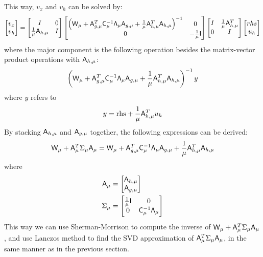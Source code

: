 This way, $v_x$ and $v_h$ can be solved by: 
\begin{equation}\label{eq:core_equ}
\begin{bmatrix} v_x \\ v_h  \end{bmatrix} 
=
\begin{bmatrix}
I & 0 \\
\frac{1}{\mu} \mathsf{A}_{h,\mu}  &  I 
\end{bmatrix}
\begin{bmatrix}
\left(\mathsf{W}_\mu +  \mathsf{A}_{g,\mu}^T  \mathsf{C}_\mu^{-1} \mathsf{\Lambda}_\mu  \mathsf{A}_{g,\mu}  
+ \frac{1}{\mu}  \mathsf{A}_{h,\mu}^T \mathsf{A}_{h,\mu} \right)^{-1}    & 0 \\
0  &  -\frac{1}{\mu}\mathsf{I} 
\end{bmatrix}
\begin{bmatrix}
I  & \frac{1}{\mu} \mathsf{A}_{h,\mu}^T  \\
0  &  I
\end{bmatrix}
\begin{bmatrix}
rhs  \\ u_h
\end{bmatrix}
\end{equation}
where the major component is the following operation besides the matrix-vector product operations with $\mathsf{A}_{h,\mu}$: 
\begin{equation}
\left(\mathsf{W}_\mu +  \mathsf{A}_{g,\mu}^T  \mathsf{C}_\mu^{-1} \mathsf{\Lambda}_\mu  \mathsf{A}_{g,\mu}  
+ \frac{1}{\mu}  \mathsf{A}_{h,\mu}^T \mathsf{A}_{h,\mu} \right)^{-1}  y
\end{equation}
where $y$ refers to 
\begin{equation}
y = \text{rhs} + \frac{1}{\mu} \mathsf{A}_{h,\mu}^T u_h
\end{equation}
By stacking $ \mathsf{A}_{h,\mu} $ and $\mathsf{A}_{g,\mu}$ together, 
the following expressions can be derived: 
\begin{equation}
\mathsf{W}_\mu  +  \mathsf{A}_\mu ^T \Sigma_{\mu} \mathsf{A}_\mu = 
\mathsf{W}_\mu +  \mathsf{A}_{g,\mu}^T  \mathsf{C}_\mu^{-1} \mathsf{\Lambda}_\mu  \mathsf{A}_{g,\mu}  
+ \frac{1}{\mu}  \mathsf{A}_{h,\mu}^T \mathsf{A}_{h,\mu} 
\end{equation}
where 
\begin{equation}
\begin{aligned}
 \mathsf{A}_\mu &= 
 \begin{bmatrix}
 \mathsf{A}_{h,\mu} \\
 \mathsf{A}_{g,\mu}
 \end{bmatrix} \\
  \Sigma_{\mu} &= 
  \begin{bmatrix}  
  \frac{1}{\mu} \mathsf{I}  & 0 \\
  0   &  \mathsf{C}_\mu^{-1} \mathsf{\Lambda}_\mu 
  \end{bmatrix}
 \end{aligned}
\end{equation}
This way we can use Sherman-Morrison to compute the inverse of 
$\mathsf{W}_\mu  +  \mathsf{A}_\mu ^T \Sigma_{\mu} \mathsf{A}_\mu$, and use Lanczos method to find the SVD 
approximation of $\mathsf{A}_\mu ^T \Sigma_{\mu} \mathsf{A}_\mu$, in the same manner as in the previous section. 

